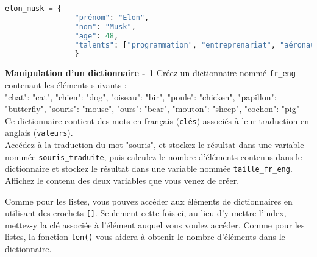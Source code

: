 	 \begin{lstlisting}[language=Python]
          elon_musk = {
                "prénom": "Elon",
                "nom": "Musk",
                "age": 48,
                "talents": ["programmation", "entreprenariat", "aéronautique"]
				}   \end{lstlisting}
				
	\begin{Exercice}[5 minutes] \textbf{Manipulation d'un dictionnaire - 1}
       Créez un dictionnaire nommé \lstinline{fr_eng} contenant les éléments suivants : \\
       
       "chat": "cat", "chien": "dog", "oiseau": "bir", "poule": "chicken", "papillon": "butterfly", "souris": "mouse", "ours": "bear", "mouton": "sheep", "cochon": "pig" \\
       
       Ce dictionnaire contient des mots en français (\lstinline{clés}) associés à leur traduction en anglais (\lstinline{valeurs}). \\
       
       Accédez à la traduction du mot "souris", et stockez le résultat dans une variable nommée \lstinline{souris_traduite}, puis calculez le nombre d'éléments contenus dans le dictionnaire et stockez le résultat dans une variable nommée \lstinline{taille_fr_eng}. Affichez le contenu des deux variables que vous venez de créer.
    
        \begin{conseil}
            Comme pour les listes, vous pouvez accéder aux éléments de dictionnaires en utilisant des crochets \lstinline{[]}. Seulement cette fois-ci, au lieu d'y mettre l'index, mettez-y la clé associée à l'élément auquel vous voulez accéder. Comme pour les listes, la fonction \lstinline{len()} vous aidera à obtenir le nombre d'éléments dans le dictionnaire.
        \end{conseil}
        
        \begin{solution}
             
        \end{solution}
    \end{Exercice}
    
